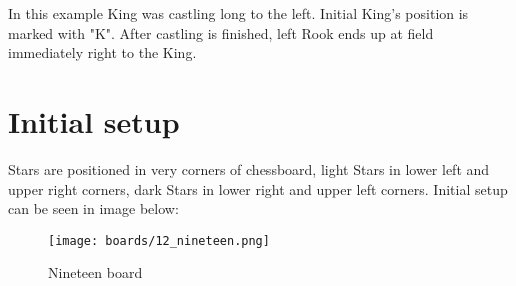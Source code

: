 In this example King was castling long to the left. Initial King's position is marked with "K".
After castling is finished, left Rook ends up at field immediately right to the King.

\clearpage %

\section*{Initial setup}

Stars are positioned in very corners of chessboard, light Stars in lower left and upper right
corners, dark Stars in lower right and upper left corners. Initial setup can be seen in image below:

\noindent
\begin{figure}[h]
\texttt{[image: boards/12\_nineteen.png]}
\caption{Nineteen board}
\label{fig:12_nineteen}
\end{figure}

\clearpage %
